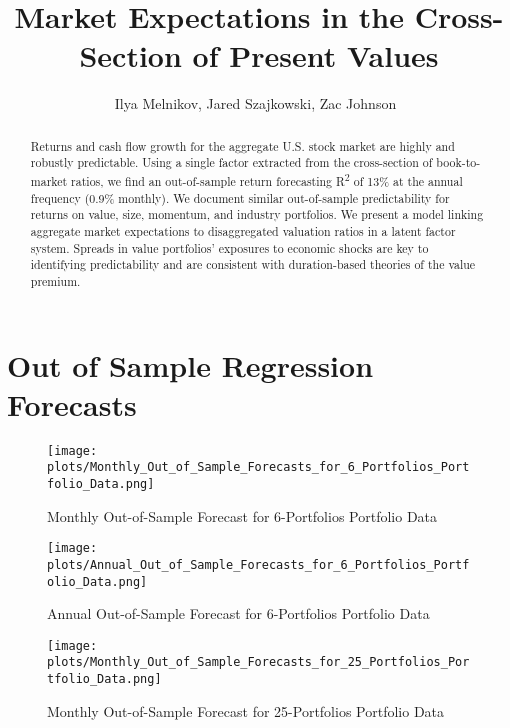 \documentclass[12pt]{article}
\begin{document}
\title{
Market Expectations in the Cross-Section of Present Values
}

\author{
Ilya Melnikov, Jared Szajkowski, Zac Johnson\
}
\begin{titlepage}
\maketitle

\doublespacing
\begin{abstract}
    Returns and cash flow growth for the aggregate U.S. stock market are highly and robustly predictable. 
    Using a single factor extracted from the cross-section of book-to-market ratios, 
    we find an out-of-sample return forecasting R\textsuperscript{2} of 13\% at the annual frequency (0.9\% monthly). 
    We document similar out-of-sample predictability for returns on value, size, momentum, and industry portfolios. 
    We present a model linking aggregate market expectations to disaggregated valuation ratios in a latent factor system. 
    Spreads in value portfolios’ exposures to economic shocks are key to identifying predictability and are consistent 
    with duration-based theories of the value premium.
\end{abstract}

\end{titlepage}

\doublespacing
\section{Out of Sample Regression Forecasts}
\begin{figure}[h]
    \centering
    \texttt{[image: plots/Monthly\_Out\_of\_Sample\_Forecasts\_for\_6\_Portfolios\_Portfolio\_Data.png]}
    \caption{Monthly Out-of-Sample Forecast for 6-Portfolios Portfolio Data}
    \label{fig:forecast_6_monthly}
\end{figure}

\begin{figure}[h]
    \centering
    \texttt{[image: plots/Annual\_Out\_of\_Sample\_Forecasts\_for\_6\_Portfolios\_Portfolio\_Data.png]}
    \caption{Annual Out-of-Sample Forecast for 6-Portfolios Portfolio Data}
    \label{fig:forecast_6_annual}
\end{figure}

\begin{figure}[h]
    \centering
    \texttt{[image: plots/Monthly\_Out\_of\_Sample\_Forecasts\_for\_25\_Portfolios\_Portfolio\_Data.png]}
    \caption{Monthly Out-of-Sample Forecast for 25-Portfolios Portfolio Data}
    \label{fig:forecast_25_monthly}
\end{figure}
\end{document}
